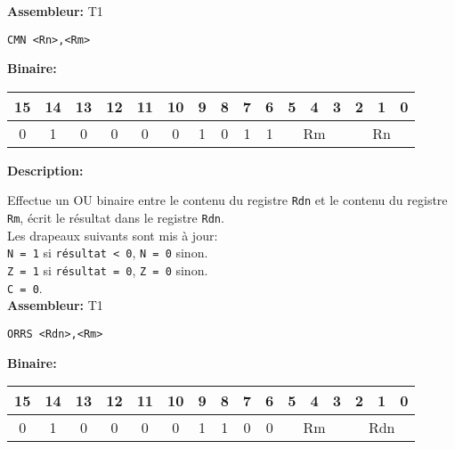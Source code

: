 \documentclass{article}
\begin{document}
    \textbf{Assembleur:} T1

    \begin{lstlisting}
CMN <Rn>,<Rm>
    \end{lstlisting}

    \textbf{Binaire:}\\

    \begin{tabular}{| c c c c c c c c c c c c c c c c |}
        \hline
        15 & 14 & 13 & 12 & 11 & 10 & \multicolumn{1}{|c}{9} & 8 & 7 & 6 & \multicolumn{1}{|c}{5} & 4 & 3 & \multicolumn{1}{|c}{2} & 1 & 0 \\
        \hline
        0 & 1 & 0 & 0 & 0 & 0 & \multicolumn{1}{|c}{1} & 0 & 1 & 1 & \multicolumn{3}{|c}{Rm} & \multicolumn{3}{|c|}{Rn} \\
        \hline
    \end{tabular}



    \textbf{Description: }

    Effectue un OU binaire entre le contenu du registre \texttt{Rdn} et le contenu du registre \texttt{Rm}, écrit le résultat dans le registre \texttt{Rdn}.\\
    Les drapeaux suivants sont mis à jour:\\
    \texttt{N = 1} si \texttt{résultat < 0}, \texttt{N = 0} sinon.\\
    \texttt{Z = 1} si \texttt{résultat = 0}, \texttt{Z = 0} sinon.\\
    \texttt{C = 0}.\\

    \textbf{Assembleur:} T1

    \begin{lstlisting}
ORRS <Rdn>,<Rm>
    \end{lstlisting}

    \textbf{Binaire:}\\

    \begin{tabular}{| c c c c c c c c c c c c c c c c |}
        \hline
        15 & 14 & 13 & 12 & 11 & 10 & \multicolumn{1}{|c}{9} & 8 & 7 & 6 & \multicolumn{1}{|c}{5} & 4 & 3 & \multicolumn{1}{|c}{2} & 1 & 0 \\
        \hline
        0 & 1 & 0 & 0 & 0 & 0 & \multicolumn{1}{|c}{1} & 1 & 0 & 0 & \multicolumn{3}{|c}{Rm} & \multicolumn{3}{|c|}{Rdn} \\
        \hline
    \end{tabular}
\end{document}
